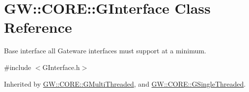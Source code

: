 \hypertarget{class_g_w_1_1_c_o_r_e_1_1_g_interface}{}\section{GW\+:\+:C\+O\+RE\+:\+:G\+Interface Class Reference}
\label{class_g_w_1_1_c_o_r_e_1_1_g_interface}


Base interface all Gateware interfaces must support at a minimum.  




{\ttfamily \#include $<$G\+Interface.\+h$>$}



Inherited by \hyperlink{class_g_w_1_1_c_o_r_e_1_1_g_multi_threaded}{G\+W\+::\+C\+O\+R\+E\+::\+G\+Multi\+Threaded}, and \hyperlink{class_g_w_1_1_c_o_r_e_1_1_g_single_threaded}{G\+W\+::\+C\+O\+R\+E\+::\+G\+Single\+Threaded}.


